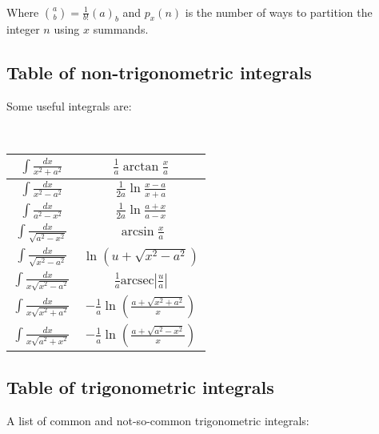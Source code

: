 \documentclass[a4paper]{amsart}
\begin{document}
\begin{multicols}{2}
      \ 

      Where $\binom{a}{b} = \frac{1}{b!}(a)_b $ and $p_x(n)$ is the number of ways to partition the integer $n$ using $x$ summands.

    \subsection{Table of non-trigonometric integrals}
      Some  useful integrals are:

      \ 
      
      \begin{tabular}{|c|c|}
        \hline 
        $\int \frac{dx}{x^2 + a^2}$ & $\frac{1}{a} \arctan \frac{x}{a}$ \\ \hline
        $\int \frac{dx}{x^2 - a^2}$ & $\frac{1}{2a} \ln \frac{x - a}{x + a}$ \\ \hline
        $\int \frac{dx}{a^2 - x^2}$ & $\frac{1}{2a} \ln \frac{a + x}{a - x}$ \\ \hline
        $\int \frac{dx}{\sqrt{a^2 - x^2}}$ & $\arcsin \frac{x}{a}$ \\ \hline
        $\int \frac{dx}{\sqrt{x^2 - a^2}}$ & $\ln \left(u + \sqrt{x^2 - a^2}\right)$ \\ \hline
        $\int \frac{dx}{x \sqrt{x^2 - a^2}}$ & $\frac{1}{a} \text{arcsec} \left| \frac{u}{a} \right|$ \\ \hline
        $\int \frac{dx}{x \sqrt{x^2 + a^2}}$ & $-\frac{1}{a} \ln \left( \frac{a + \sqrt{x^2 + a^2}}{x} \right)$ \\ \hline
        $\int \frac{dx}{x \sqrt{a^2 + x^2}}$ & $-\frac{1}{a} \ln \left( \frac{a + \sqrt{a^2 - x^2}}{x} \right)$ \\ \hline
      \end{tabular}

    \subsection{Table of trigonometric integrals}
      A list of common and not-so-common trigonometric integrals:

      \ 


\end{multicols}
\end{document}
